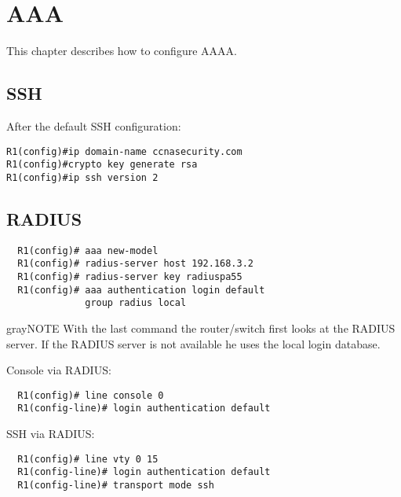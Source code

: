 \section{AAA}
This chapter describes how to configure AAAA.

\subsection{SSH}
After the default SSH configuration:
\begin{verbatim}
R1(config)#ip domain-name ccnasecurity.com
R1(config)#crypto key generate rsa
R1(config)#ip ssh version 2
\end{verbatim}

\subsection{RADIUS}
\begin{verbatim}
  R1(config)# aaa new-model
  R1(config)# radius-server host 192.168.3.2
  R1(config)# radius-server key radiuspa55
  R1(config)# aaa authentication login default
              group radius local
\end{verbatim}
\begin{textbox}{gray}{NOTE}
  With the last command the router/switch first looks at the RADIUS server.
  If the RADIUS server is not available he uses the local login database.
\end{textbox}
Console via RADIUS:
\begin{verbatim}
  R1(config)# line console 0
  R1(config-line)# login authentication default
\end{verbatim}

SSH via RADIUS:
\begin{verbatim}
  R1(config)# line vty 0 15
  R1(config-line)# login authentication default
  R1(config-line)# transport mode ssh
\end{verbatim}
